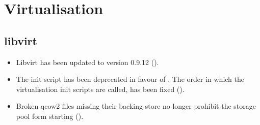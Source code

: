 \section{Virtualisation}

\subsection{libvirt}
\begin{itemize}
\item Libvirt has been updated to version 0.9.12
  ().
\item The init script
  has been deprecated in favour of
  . The order in which the
  virtualisation init scripts are called, has been fixed ().

\item Broken qcow2 files missing their backing store no longer
  prohibit the storage pool form starting ().
\end{itemize}

